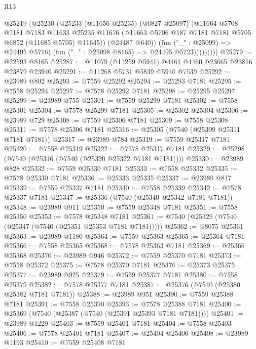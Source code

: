 \begin{lexlean}{R13}
\begin{coremodule}
                @25219
                  (@25230
                    (@25233
                      (@11656 @25235)
                      (@6827 @25097)
                      (@11664
                        @5708
                        @7181
                        @7183
                        @11633
                        @25235
                        @11676
                        (@11663 @5706 @187 @7181 @7181 @5705 @6852 (@11685 @5705) @11645))
                      (@24487 @640))
                    (fun ("_" : @25099) => @24495 @5716)
                    (fun ("_" : @25098 @8165) => @24495 @5723)))))))))
@25279 := @22593 @8165
@25287 := @11079 (@11259 @5941) @4461 @4460 @23665 @23816 @23879 @23940
@25291 := @11268 @5731 @5839 @5940 @7539
@25292 := @23989 @802
@25293 := @7559 @25292
@25294 := @25293 @7181
@25295 := @7558 @25294
@25297 := @7578 @25292 @7181
@25298 := @25295 @25297
@25299 := @23989 @755
@25301 := @7559 @25299 @7181
@25302 := @7558 @25301
@25304 := @7578 @25299 @7181
@25305 := @25302 @25304
@25306 := @23989 @729
@25308 := @7559 @25306 @7181
@25309 := @7558 @25308
@25311 := @7578 @25306 @7181
@25316 := @25305 (@7540 (@25309 @25311 @7181 @7181))
@25317 := @23989 @784
@25319 := @7559 @25317 @7181
@25320 := @7558 @25319
@25322 := @7578 @25317 @7181
@25329 := @25298 (@7540 (@25316 (@7540 (@25320 @25322 @7181 @7181))))
@25330 := @23989 @828
@25332 := @7559 @25330 @7181
@25333 := @7558 @25332
@25335 := @7578 @25330 @7181
@25336 := @25333 @25335
@25337 := @23989 @817
@25339 := @7559 @25337 @7181
@25340 := @7558 @25339
@25342 := @7578 @25337 @7181
@25347 := @25336 (@7540 (@25340 @25342 @7181 @7181))
@25348 := @23989 @911
@25350 := @7559 @25348 @7181
@25351 := @7558 @25350
@25353 := @7578 @25348 @7181
@25361 := @7540 (@25329 (@7540 (@25347 (@7540 (@25351 @25353 @7181 @7181)))))
@25362 := @8075 @25361
@25363 := @23989 @1180
@25364 := @7559 @25363
@25365 := @25364 @7181
@25366 := @7558 @25365
@25368 := @7578 @25363 @7181
@25369 := @25366 @25368
@25370 := @23989 @946
@25372 := @7559 @25370 @7181
@25373 := @7558 @25372
@25375 := @7578 @25370 @7181
@25376 := @25373 @25375
@25377 := @23989 @925
@25379 := @7559 @25377 @7181
@25380 := @7558 @25379
@25382 := @7578 @25377 @7181
@25387 := @25376 (@7540 (@25380 @25382 @7181 @7181))
@25388 := @23989 @951
@25390 := @7559 @25388 @7181
@25391 := @7558 @25390
@25393 := @7578 @25388 @7181
@25400 := @25369 (@7540 (@25387 (@7540 (@25391 @25393 @7181 @7181))))
@25401 := @23989 @1229
@25403 := @7559 @25401 @7181
@25404 := @7558 @25403
@25406 := @7578 @25401 @7181
@25407 := @25404 @25406
@25408 := @23989 @1193
@25410 := @7559 @25408 @7181

\end{coremodule}
\end{lexlean}
